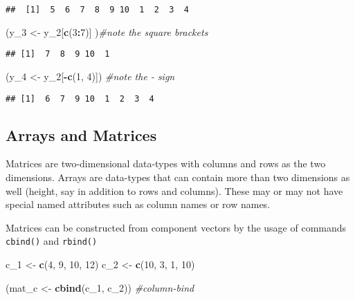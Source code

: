 \documentclass[11pt,]{article}
\newenvironment{Shaded}{\begin{snugshade}}{\end{snugshade}}
\newcommand{\KeywordTok}[1]{\textcolor[rgb]{0.13,0.29,0.53}{\textbf{#1}}}
\newcommand{\DecValTok}[1]{\textcolor[rgb]{0.00,0.00,0.81}{#1}}
\newcommand{\StringTok}[1]{\textcolor[rgb]{0.31,0.60,0.02}{#1}}
\newcommand{\CommentTok}[1]{\textcolor[rgb]{0.56,0.35,0.01}{\textit{#1}}}
\newcommand{\OperatorTok}[1]{\textcolor[rgb]{0.81,0.36,0.00}{\textbf{#1}}}
\newcommand{\NormalTok}[1]{#1}
\begin{document}
\begin{verbatim}
##  [1]  5  6  7  8  9 10  1  2  3  4
\end{verbatim}

\begin{Shaded}
\begin{Highlighting}[]
\NormalTok{(y_}\DecValTok{3}\NormalTok{ <-}\StringTok{ }\NormalTok{y_}\DecValTok{2}\NormalTok{[}\KeywordTok{c}\NormalTok{(}\DecValTok{3}\OperatorTok{:}\DecValTok{7}\NormalTok{)] )}\CommentTok{#note the square brackets}
\end{Highlighting}
\end{Shaded}

\begin{verbatim}
## [1]  7  8  9 10  1
\end{verbatim}

\begin{Shaded}
\begin{Highlighting}[]
\NormalTok{(y_}\DecValTok{4}\NormalTok{ <-}\StringTok{ }\NormalTok{y_}\DecValTok{2}\NormalTok{[}\OperatorTok{-}\KeywordTok{c}\NormalTok{(}\DecValTok{1}\NormalTok{, }\DecValTok{4}\NormalTok{)]) }\CommentTok{#note the - sign}
\end{Highlighting}
\end{Shaded}

\begin{verbatim}
## [1]  6  7  9 10  1  2  3  4
\end{verbatim}

\subsection{Arrays and Matrices}\label{arrays-and-matrices}

Matrices are two-dimensional data-types with columns and rows as the two
dimensions. Arrays are data-types that can contain more than two
dimensions as well (height, say in addition to rows and columns). These
may or may not have special named attributes such as column names or row
names.

Matrices can be constructed from component vectors by the usage of
commands \texttt{cbind()} and \texttt{rbind()}

\begin{Shaded}
\begin{Highlighting}[]
\NormalTok{c_}\DecValTok{1}\NormalTok{ <-}\StringTok{ }\KeywordTok{c}\NormalTok{(}\DecValTok{4}\NormalTok{, }\DecValTok{9}\NormalTok{, }\DecValTok{10}\NormalTok{, }\DecValTok{12}\NormalTok{)}
\NormalTok{c_}\DecValTok{2}\NormalTok{ <-}\StringTok{ }\KeywordTok{c}\NormalTok{(}\DecValTok{10}\NormalTok{, }\DecValTok{3}\NormalTok{, }\DecValTok{1}\NormalTok{, }\DecValTok{10}\NormalTok{)}

\NormalTok{(mat_c <-}\StringTok{ }\KeywordTok{cbind}\NormalTok{(c_}\DecValTok{1}\NormalTok{, c_}\DecValTok{2}\NormalTok{)) }\CommentTok{#column-bind}
\end{Highlighting}
\end{Shaded}
\end{document}

